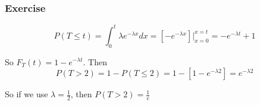 \documentclass{beamer}
\begin{document}

\begin{frame}
\frametitle{Exercise}

\[
P(T \le t) = \int_{0}^{t} \lambda e^{- \lambda x}dx = [- e^{-\lambda x} ]|_{x = 0}^{x=t} = -e^{-\lambda t} + 1
\]

So $F_T(t) = 1 - e^{-\lambda t}$. Then 
\[
P(T > 2) = 1-P(T\le 2) = 1 - [1 - e^{-\lambda 2}] =  e^{-\lambda 2}
\]

So if we use $\lambda = \frac{1}{2}$, then $P(T > 2) = \frac{1}{e}$
\end{frame}

\end{document}
